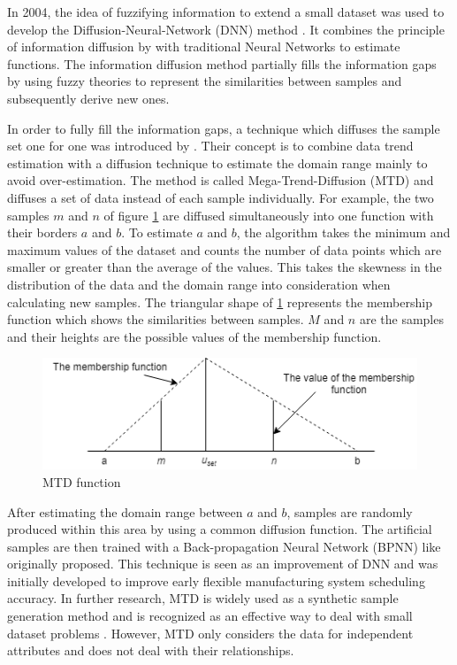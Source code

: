 \documentclass[parskip=full]{scrartcl}
\begin{document}
In 2004, the idea of fuzzifying information to extend a small dataset was used
to develop the Diffusion-Neural-Network (DNN) method \cite{Huang.2004}. It
combines the principle of information diffusion by \cite{Huang.1997} with
traditional Neural Networks to estimate functions. The information diffusion
method partially fills the information gaps by using fuzzy theories to represent
the similarities between samples and subsequently derive new ones. 

In order to fully fill the information gaps, a technique which diffuses the
sample set one for one was introduced by \cite{Li.2007}. Their concept is to
combine data trend estimation with a diffusion technique to estimate the domain
range mainly to avoid over-estimation. The method is called Mega-Trend-Diffusion
(MTD) and diffuses a set of data instead of each sample individually. For
example, the two samples $\mathit{m}$ and $\mathit{n}$ of figure
\ref{fig:mtd-function} are diffused simultaneously into one function with their
borders $\mathit{a}$ and $\mathit{b}$. To estimate $\mathit{a}$ and
$\mathit{b}$, the algorithm takes the minimum and maximum values of the dataset
and counts the number of data points which are smaller or greater than the
average of the values. This takes the skewness in the distribution of the data
and the domain range into consideration when calculating new samples. The
triangular shape of \ref{fig:mtd-function} represents the membership function
which shows the similarities between samples. $\mathit{M}$ and $\mathit{n}$ are
the samples and their heights are the possible values of the membership
function.

\begin{figure}[H]
	\centering
	\includegraphics[width=0.6\linewidth]{../analysis/mtd_function.png}
	\caption{MTD function \cite{Li.2007}}
	\label{fig:mtd-function}
\end{figure}

After estimating the domain range between $\mathit{a}$ and $\mathit{b}$, samples
are randomly produced within this area by using a common diffusion function. The
artificial samples are then trained with a Back-propagation Neural Network
(BPNN) like \cite{Huang.2004} originally proposed. This technique is seen as an
improvement of DNN and was initially developed to improve early flexible
manufacturing system scheduling accuracy. In further research, MTD is widely
used as a synthetic sample generation method and is recognized as an effective
way to deal with small dataset problems \cite{AbdulLateh.2017}. However, MTD
only considers the data for independent attributes and does not deal with their
relationships. 
\end{document}
